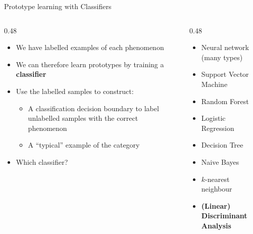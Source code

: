 \documentclass[aspectratio=169]{beamer}
\begin{document}
\begin{frame}{Prototype learning with Classifiers}
  \begin{columns}[T]
    \begin{column}{0.48\textwidth}
      \begin{itemize}
        \item We have labelled examples of each phenomenon
        \item We can therefore learn prototypes by training a \textbf{classifier}
        \item Use the labelled samples to construct:
        \begin{itemize}
          \item A classification decision boundary to label unlabelled samples with the correct phenomenon
          \item A ``typical'' example of the category
        \end{itemize}
        \item Which classifier?
      \end{itemize}
    \end{column}
    \pause
    \begin{column}{0.48\textwidth}
      \begin{itemize}
        \item Neural network (many types)
        \item Support Vector Machine
        \item Random Forest
        \item Logistic Regression
        \item Decision Tree 
        \item Naive Bayes
        \item $k$-nearest neighbour
        \pause
        \item \textbf{(Linear) Discriminant Analysis}
      \end{itemize}
    \end{column}
  \end{columns}
\end{frame}
\end{document}
